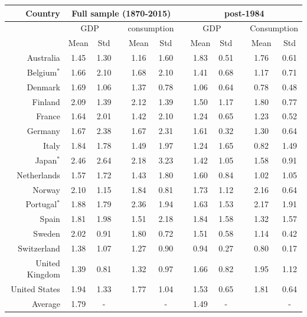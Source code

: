 {{{{\renewcommand{\arraystretch}{1.0}
\begin{table}[H]
\begin{center}
\begin{tabular}{rccccccccccc}
\hline
\hline
Country & \multicolumn{5}{c}{Full sample (1870-2015)} & & \multicolumn{5}{c}{post-1984} \\
\hline
 & \multicolumn{2}{c}{GDP} & & \multicolumn{2}{c}{consumption} & & \multicolumn{2}{c}{GDP} & & \multicolumn{2}{c}{Consumption}\\
\cline{2-3} \cline{5-6} \cline{8-9} \cline{11-12}
 & Mean & Std & & Mean & Std & & Mean & Std & & Mean & Std\\
\hline
Australia & 1.45 & 1.30 & & 1.16 & 1.60 & & 1.83 & 0.51 & & 1.76 & 0.61\\
Belgium$^{*}$ & 1.66 & 2.10 & & 1.68 & 2.10 & & 1.41 & 0.68 & & 1.17 & 0.71 \\
Denmark & 1.69 & 1.06 & & 1.37 & 0.78 & & 1.06 & 0.64 & & 0.78 & 0.48 \\
Finland & 2.09 & 1.39 & & 2.12 & 1.39 & & 1.50 & 1.17 & & 1.80 & 0.77\\
France & 1.64 & 2.01 & & 1.42 & 2.10 & & 1.24 & 0.65 & & 1.23 & 0.52\\
Germany & 1.67 & 2.38 & & 1.67 & 2.31 & & 1.61 & 0.32 & & 1.30 & 0.64\\
Italy & 1.84 & 1.78 & & 1.49 & 1.97 & & 1.24 & 1.65 & & 0.82 & 1.49\\
Japan$^{*}$ & 2.46 & 2.64 & & 2.18 & 3.23 & & 1.42 & 1.05 & & 1.58 & 0.91\\
Netherlands & 1.57 & 1.72 & & 1.43 & 1.80 & & 1.60 & 0.84 & & 1.02 & 1.05 \\
Norway & 2.10 & 1.15 & & 1.84 & 0.81 & & 1.73 & 1.12 & & 2.16 & 0.64\\
Portugal$^{*}$ & 1.88 & 1.79 & & 2.36 & 1.94 & & 1.63 & 1.53 & & 2.17 & 1.91 \\
Spain & 1.81 & 1.98 & & 1.51 &  2.18 & & 1.84 & 1.58 & & 1.32 & 1.57\\
Sweden & 2.02 & 0.91 & & 1.80 & 0.72 & & 1.51 & 0.58 & & 1.14 & 0.42\\
Switzerland & 1.38 & 1.07 & & 1.27 & 0.90 & & 0.94 & 0.27 & & 0.80 & 0.17\\
United Kingdom & 1.39 & 0.81 & & 1.32 & 0.97 & & 1.66 & 0.82 & & 1.95 & 1.12\\
United States & 1.94 & 1.33 & & 1.77 & 1.04 & & 1.53 & 0.65 & & 1.81 & 0.64 \\
\hline
Average & 1.79 & - & &  & - & & 1.49 & - & &  & -\\


\end{tabular}
\end{center}
\end{table}}}}}
